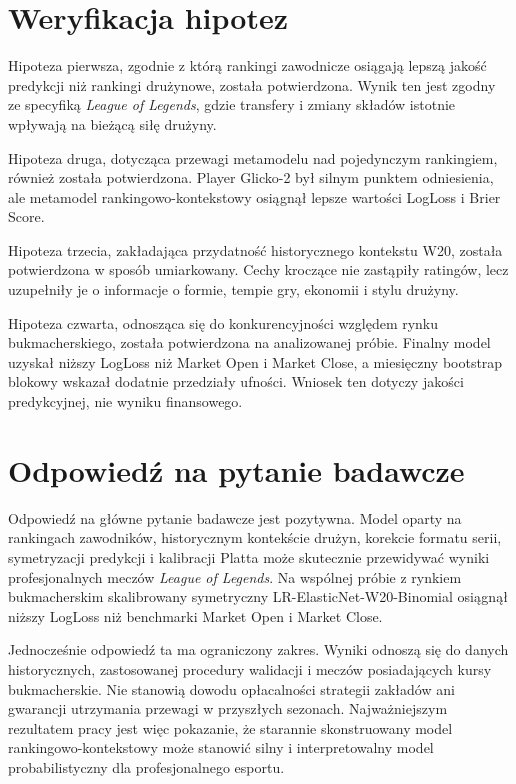 \section{Weryfikacja hipotez}

Hipoteza pierwsza, zgodnie z którą rankingi zawodnicze osiągają lepszą jakość predykcji niż rankingi
drużynowe, została potwierdzona. Wynik ten jest zgodny ze specyfiką \textit{League of Legends},
gdzie transfery i zmiany składów istotnie wpływają na bieżącą siłę drużyny.

Hipoteza druga, dotycząca przewagi metamodelu nad pojedynczym rankingiem, również została
potwierdzona. Player Glicko-2 był silnym punktem odniesienia, ale metamodel rankingowo-kontekstowy
osiągnął lepsze wartości LogLoss i Brier Score.

Hipoteza trzecia, zakładająca przydatność historycznego kontekstu W20, została potwierdzona w sposób
umiarkowany. Cechy kroczące nie zastąpiły ratingów, lecz uzupełniły je o informacje o formie, tempie
gry, ekonomii i stylu drużyny.

Hipoteza czwarta, odnosząca się do konkurencyjności względem rynku bukmacherskiego, została
potwierdzona na analizowanej próbie. Finalny model uzyskał niższy LogLoss niż Market Open i Market
Close, a miesięczny bootstrap blokowy wskazał dodatnie przedziały ufności. Wniosek ten dotyczy
jakości predykcyjnej, nie wyniku finansowego.

\section{Odpowiedź na pytanie badawcze}

Odpowiedź na główne pytanie badawcze jest pozytywna. Model oparty na rankingach zawodników,
historycznym kontekście drużyn, korekcie formatu serii, symetryzacji predykcji i kalibracji Platta
może skutecznie przewidywać wyniki profesjonalnych meczów \textit{League of Legends}. Na wspólnej
próbie z rynkiem bukmacherskim skalibrowany symetryczny LR-ElasticNet-W20-Binomial osiągnął niższy
LogLoss niż benchmarki Market Open i Market Close.

Jednocześnie odpowiedź ta ma ograniczony zakres. Wyniki odnoszą się do danych historycznych,
zastosowanej procedury walidacji i meczów posiadających kursy bukmacherskie. Nie stanowią dowodu
opłacalności strategii zakładów ani gwarancji utrzymania przewagi w przyszłych sezonach.
Najważniejszym rezultatem pracy jest więc pokazanie, że starannie skonstruowany model
rankingowo-kontekstowy może stanowić silny i interpretowalny model probabilistyczny dla
profesjonalnego esportu.
